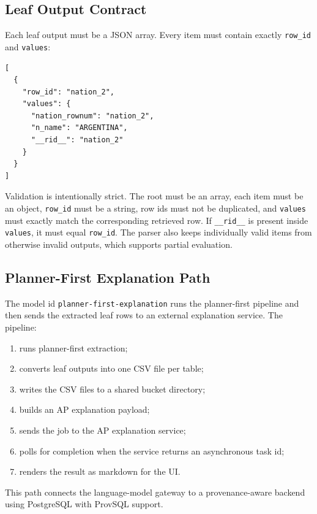 \documentclass[11pt,a4paper]{article}
\begin{document}
\subsection{Leaf Output Contract}

Each leaf output must be a JSON array. Every item must contain exactly
\texttt{row\_id} and \texttt{values}:

\begin{lstlisting}[style=codestyle]
[
  {
    "row_id": "nation_2",
    "values": {
      "nation_rownum": "nation_2",
      "n_name": "ARGENTINA",
      "__rid__": "nation_2"
    }
  }
]
\end{lstlisting}

Validation is intentionally strict. The root must be an array, each item must be
an object, \texttt{row\_id} must be a string, row ids must not be duplicated, and
\texttt{values} must exactly match the corresponding retrieved row. If
\texttt{\_\_rid\_\_} is present inside \texttt{values}, it must equal
\texttt{row\_id}. The parser also keeps individually valid items from otherwise
invalid outputs, which supports partial evaluation.

\subsection{Planner-First Explanation Path}

The model id \texttt{planner-first-explanation} runs the planner-first pipeline
and then sends the extracted leaf rows to an external explanation service. The
pipeline:

\begin{enumerate}[leftmargin=*]
    \item runs planner-first extraction;
    \item converts leaf outputs into one CSV file per table;
    \item writes the CSV files to a shared bucket directory;
    \item builds an AP explanation payload;
    \item sends the job to the AP explanation service;
    \item polls for completion when the service returns an asynchronous task id;
    \item renders the result as markdown for the UI.
\end{enumerate}

This path connects the language-model gateway to a provenance-aware backend
using PostgreSQL with ProvSQL support.
\end{document}
